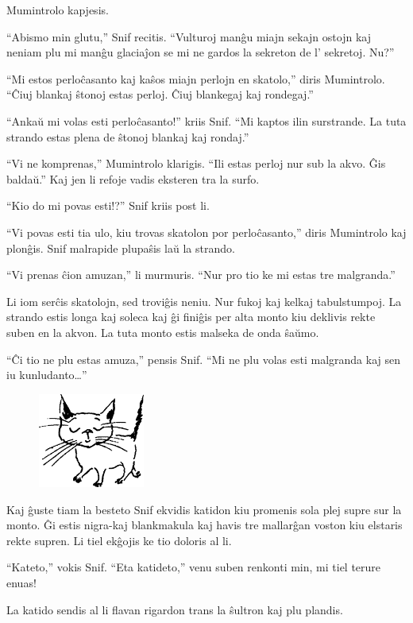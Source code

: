 Mumintrolo kapjesis.

``Abismo min glutu,'' Snif recitis. ``Vulturoj manĝu miajn sekajn ostojn kaj neniam plu mi manĝu glaciaĵon se mi ne gardos la sekreton de l' sekretoj. Nu?''

``Mi estos perloĉasanto kaj kaŝos miajn perlojn en skatolo,'' diris Mumintrolo. ``Ĉiuj blankaj ŝtonoj estas perloj. Ĉiuj blankegaj kaj rondegaj.''

``Ankaŭ mi volas esti perloĉasanto!'' kriis Snif. ``Mi kaptos ilin surstrande. La tuta strando estas plena de ŝtonoj blankaj kaj rondaj.''

``Vi ne komprenas,'' Mumintrolo klarigis. ``Ili estas perloj nur sub la akvo. Ĝis baldaŭ.'' Kaj jen li refoje vadis eksteren tra la surfo.

``Kio do mi povas esti!?'' Snif kriis post li.

``Vi povas esti tia ulo, kiu trovas skatolon por perloĉasanto,'' diris Mumintrolo kaj plonĝis. Snif malrapide plupaŝis laŭ la strando.

``Vi prenas ĉion amuzan,'' li murmuris. ``Nur pro tio ke mi estas tre malgranda.''

Li iom serĉis skatolojn, sed troviĝis neniu. Nur fukoj kaj kelkaj tabulstumpoj. La strando estis longa kaj soleca kaj ĝi finiĝis per alta monto kiu deklivis rekte suben en la akvon. La tuta monto estis malseka de onda ŝaŭmo.

``Ĉi tio ne plu estas amuza,'' pensis Snif. ``Mi ne plu volas esti malgranda kaj sen iu kunludanto{\ldots}''

\begin{figure}[htbp]
\centering
\includegraphics[width=100pt,height=88pt]{1-6.png}
\caption{}
\label{1-6}
\end{figure}

Kaj ĝuste tiam la besteto Snif ekvidis katidon kiu promenis sola plej supre sur la monto. Ĝi estis nigra-kaj blankmakula kaj havis tre mallarĝan voston kiu elstaris rekte supren. Li tiel ekĝojis ke tio doloris al li.

``Kateto,'' vokis Snif. ``Eta katideto,'' venu suben renkonti min, mi tiel terure enuas!

La katido sendis al li flavan rigardon trans la ŝultron kaj plu plandis.

